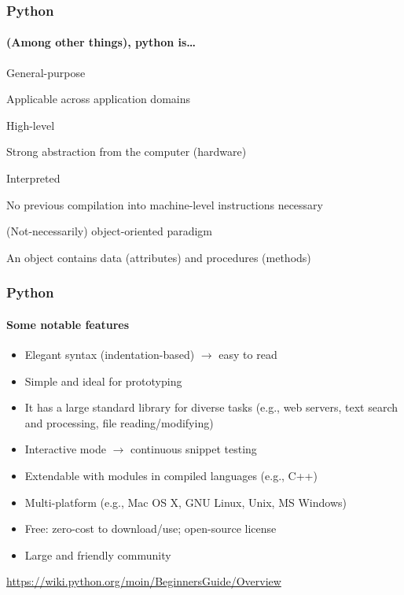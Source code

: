 \documentclass{beamer}
\newcommand{\light}[1]{\textcolor{gray}{#1}}
\begin{document}
\begin{frame}
\frametitle{Python}
\framesubtitle{(Among other things), python is\ldots}

\alert{General-purpose}

Applicable across application domains
\bigskip 	\pause

\alert{High-level}

Strong abstraction from the computer (hardware)
\bigskip 	\pause

\alert{Interpreted}

No previous compilation into machine-level instructions necessary
\bigskip 	\pause

\alert{(Not-necessarily) object-oriented paradigm}

An object contains data (attributes) and procedures (methods)
\end{frame}

\begin{frame}
\frametitle{Python}
\framesubtitle{Some notable features}



\begin{itemize}
\item Elegant syntax (indentation-based) $\rightarrow$ easy to read	\pause 
\item Simple and ideal for prototyping	\pause 
\item It has a large standard library for diverse tasks (e.g., web servers, 
text search and processing, file reading/modifying)	\pause 
\item Interactive mode $\rightarrow$ continuous snippet testing	\pause 
\item Extendable with modules in compiled languages (e.g., C++)	\pause 
\item Multi-platform (e.g., Mac OS X, GNU Linux, Unix, MS Windows)	\pause 
\item Free: zero-cost to download/use; open-source license	\pause 
\item Large and friendly community
\end{itemize}
\bigskip 

\onslide 
\light{\url{https://wiki.python.org/moin/BeginnersGuide/Overview}}
\end{frame}
\end{document}
